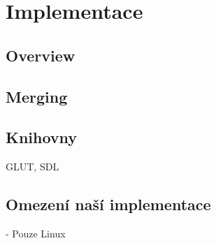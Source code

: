 
\section{Implementace}

\subsection{Overview}

\subsection{Merging}\label{merging}


\subsection{Knihovny}
GLUT, SDL

\subsection{Omezení naší implementace}

- Pouze Linux


